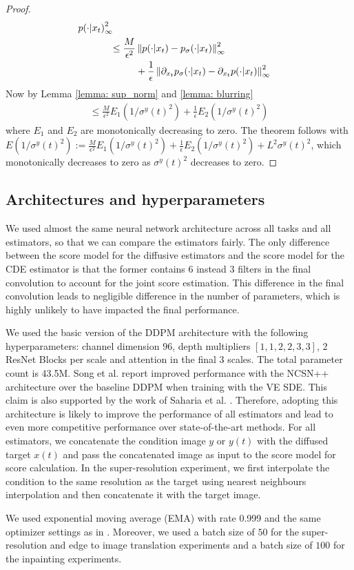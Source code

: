 \begin{proof}
\begin{align*}
\begin{aligned}
{           { p( \cdot | x_t)}  
       }_{\infty}^2 
       \end{aligned}
       \\ \! &\begin{aligned}
        \leq \frac{M}{\epsilon^2} &\left\lVert  p( \cdot | x_t) - p_{\sigma}( \cdot | x_t)
    \right\rVert_{\infty}^2 
   \\ &+ \frac{1}{\epsilon}  \left\lVert  \partial_{x_t} p_{\sigma}( \cdot | x_t) - \partial_{x_t} p( \cdot | x_t)
    \right\rVert_{\infty}^2 
   \end{aligned}
    \end{align*}
    Now by Lemma \ref{lemma: sup_norm} and \ref{lemma: blurring}
    \begin{align*}
        \leq \frac{M}{\epsilon^2} E_1(1/\sigma^y(t)^2) + \frac{1}{\epsilon}  E_2(1/\sigma^y(t)^2)
    \end{align*}
    where $E_1$ and $E_2$ are monotonically decreasing to zero.
    The theorem follows with $E(1/\sigma^y(t)^2) := \frac{M}{\epsilon^2} E_1(1/\sigma^y(t)^2) + \frac{1}{\epsilon}  E_2(1/\sigma^y(t)^2) + L^2 \sigma^y(t)^2$, which monotonically decreases to zero as $\sigma^y(t)^2$ decreases to zero.
\end{proof}

\subsection{Architectures and hyperparameters}
\label{appendix:hyperparams}
We used almost the same neural network architecture across all tasks and all estimators, so that we can compare the estimators fairly. The only difference between the score model for the diffusive estimators and the score model for the CDE estimator is that the former contains $6$ instead $3$ filters in the final convolution to account for the joint score estimation. This difference in the final convolution leads to negligible difference in the number of parameters, which is highly unlikely to have impacted the final performance. 

We used the basic version of the DDPM architecture with the following hyperparameters: channel dimension $96$, depth multipliers $[1, 1, 2, 2, 3, 3]$, $2$ ResNet Blocks per scale and attention in the final $3$ scales. The total parameter count is 43.5M. Song et al. \cite{song2021sde} report improved performance with the NCSN++ architecture over the baseline DDPM when training with the VE SDE. This claim is also supported by the work of Saharia et al. \cite{saharia2021sr3}. Therefore, adopting this architecture is likely to improve the performance of all estimators and lead to even more competitive performance over state-of-the-art methods. For all estimators, we concatenate the condition image $y$ or $y(t)$ with the diffused target $x(t)$ and pass the concatenated image as input to the score model for score calculation. In the super-resolution experiment, we first interpolate the condition to the same resolution as the target using nearest neighbours interpolation and then concatenate it with the target image. 

We used exponential moving average (EMA) with rate 0.999 and the same optimizer settings as in \cite{song2021sde}. Moreover, we used a batch size of $50$ for the super-resolution and edge to image translation experiments and a batch size of $100$ for the inpainting experiments. 